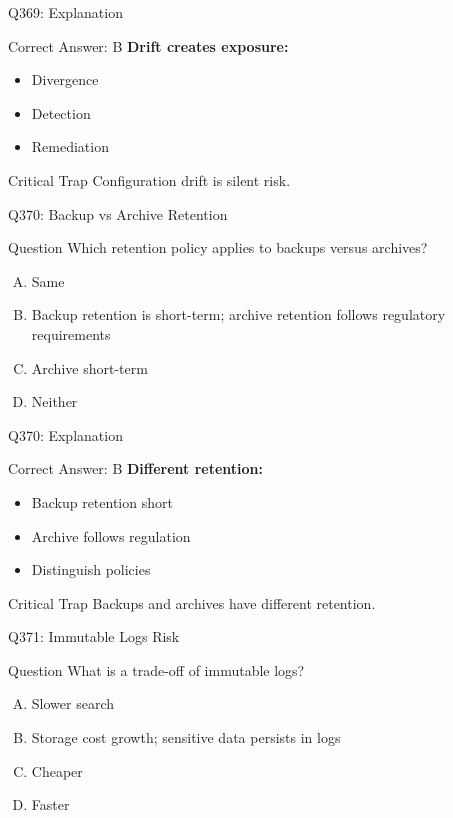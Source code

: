 \documentclass{beamer}
\begin{document}
	\begin{frame}{Q369: Explanation}
		\begin{block}{Correct Answer: B}
			\textbf{Drift creates exposure:}
			\begin{itemize}
				\item Divergence
				\item Detection
				\item Remediation
			\end{itemize}
		\end{block}
		\begin{alertblock}{Critical Trap}
			Configuration drift is silent risk.
		\end{alertblock}
	\end{frame}
	
	\begin{frame}{Q370: Backup vs Archive Retention}
		\begin{block}{Question}
			Which retention policy applies to backups versus archives?
		\end{block}
		\begin{enumerate}[(A)]
			\item Same
			\item Backup retention is short-term; archive retention follows regulatory requirements
			\item Archive short-term
			\item Neither
		\end{enumerate}
	\end{frame}
	
	\begin{frame}{Q370: Explanation}
		\begin{block}{Correct Answer: B}
			\textbf{Different retention:}
			\begin{itemize}
				\item Backup retention short
				\item Archive follows regulation
				\item Distinguish policies
			\end{itemize}
		\end{block}
		\begin{alertblock}{Critical Trap}
			Backups and archives have different retention.
		\end{alertblock}
	\end{frame}
	
	\begin{frame}{Q371: Immutable Logs Risk}
		\begin{block}{Question}
			What is a trade-off of immutable logs?
		\end{block}
		\begin{enumerate}[(A)]
			\item Slower search
			\item Storage cost growth; sensitive data persists in logs
			\item Cheaper
			\item Faster
		\end{enumerate}
	\end{frame}
	
\end{document}
